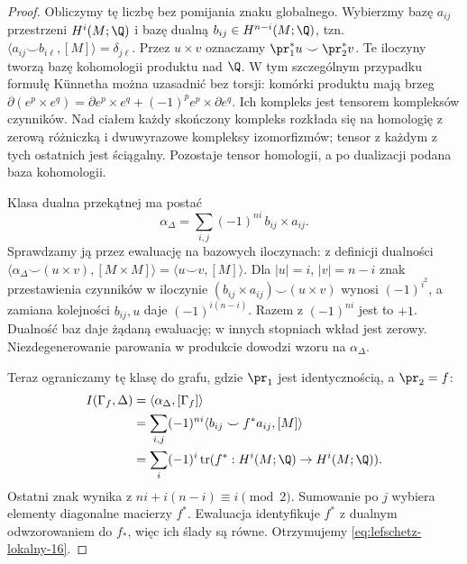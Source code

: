 \begin{proof}
Obliczymy tę liczbę bez pomijania znaku globalnego.
Wybierzmy bazę $a_{ij}$ przestrzeni $H^i(M;\Q)$
i bazę dualną $b_{ij}\in H^{n-i}(M;\Q)$, tzn.
$\langle a_{ij}\smile b_{i\ell},[M]\rangle=\delta_{j\ell}$.
Przez $u\times v$ oznaczamy
$\pr_1^*u\smile\pr_2^*v$. Te iloczyny tworzą bazę
kohomologii produktu nad $\Q$. W tym szczególnym
przypadku formułę Künnetha można uzasadnić bez torsji:
komórki produktu mają brzeg
$\partial(e^p\times e^q)=\partial e^p\times e^q+
(-1)^p e^p\times\partial e^q$.
Ich kompleks jest tensorem kompleksów czynników.
Nad ciałem każdy skończony kompleks rozkłada się na
homologię z zerową różniczką i dwuwyrazowe kompleksy
izomorfizmów; tensor z każdym z tych ostatnich
jest ściągalny. Pozostaje tensor homologii,
a po dualizacji podana baza kohomologii.

Klasa dualna przekątnej ma postać
\[
 \alpha_\Delta=\sum_{i,j}(-1)^{ni}\,b_{ij}\times a_{ij}.
\]
Sprawdzamy ją przez ewaluację na bazowych iloczynach:
z definicji dualności
$\langle\alpha_\Delta\smile(u\times v),[M\times M]\rangle
=\langle u\smile v,[M]\rangle$.
Dla $|u|=i$, $|v|=n-i$ znak przestawienia czynników
w iloczynie $(b_{ij}\times a_{ij})\smile(u\times v)$
wynosi $(-1)^{i^2}$, a zamiana kolejności $b_{ij},u$
daje $(-1)^{i(n-i)}$. Razem z $(-1)^{ni}$ jest to
$+1$. Dualność baz daje żądaną ewaluację; w innych
stopniach wkład jest zerowy. Niezdegenerowanie
parowania w produkcie dowodzi wzoru na $\alpha_\Delta$.

Teraz ograniczamy tę klasę do grafu, gdzie
$\pr_1$ jest identycznością, a $\pr_2=f$:
\begin{align*}
 I(\Gamma_f,\Delta)
 &=\langle\alpha_\Delta,[\Gamma_f]\rangle\\
 &=\sum_{i,j}(-1)^{ni}
       \langle b_{ij}\smile f^*a_{ij},[M]\rangle\\
 &=\sum_i(-1)^i\operatorname{tr}
       (f^*:H^i(M;\Q)\to H^i(M;\Q)).
\end{align*}
Ostatni znak wynika z
$ni+i(n-i)\equiv i\pmod2$. Sumowanie po $j$
wybiera elementy diagonalne macierzy $f^*$.
Ewaluacja identyfikuje $f^*$ z dualnym odwzorowaniem
do $f_*$, więc ich ślady są równe. Otrzymujemy
\eqref{eq:lefschetz-lokalny-16}.


\end{proof}
